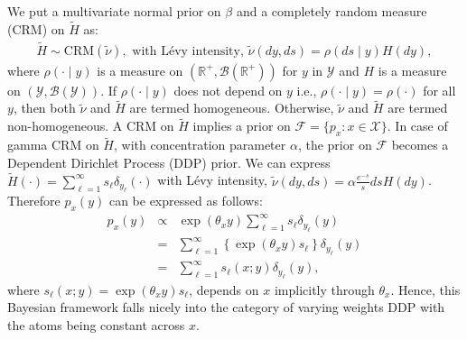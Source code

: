 \documentclass[10pt, oneside]{article}   	%
\renewcommand{\th}{\theta}
\newcommand{\thh}{\widetilde{H}}
\newcommand{\scf}{\mathcal{F}}
\newcommand{\sx}{\mathcal{X}}
\newcommand{\sy}{\mathcal{Y}}
\newcommand{\R}{\mathbb{R}}
\renewcommand{\scf}{\mathcal{F}}
\renewcommand{\sx}{\mathcal{X}}
\renewcommand{\sy}{\mathcal{Y}}
\newcommand{\sbb}{\mathcal{B}}
\begin{document}
We put a multivariate normal prior on $\beta$ and a completely random measure (CRM) on $\thh$ as:
\begin{eqnarray}
\thh \sim \mbox{CRM}(\widetilde{\nu}), \mbox{ with L\'evy intensity, } \widetilde \nu (dy, ds) = \rho(ds \mid y) H(dy), \label{eq4}
\end{eqnarray}
where $\rho(\cdot \mid y)$ is a measure on $(\R^+, \sbb(\R^+))$ for $y$ in $\sy$ and $H$ is a measure on $(\mathcal{Y}, \sbb(\sy))$.  If $\rho(\cdot \mid y)$ does not depend on $y$ i.e.,  $\rho(\cdot \mid y) = \rho(\cdot)$ for all $y$, then both $\widetilde \nu$ and $\thh$ are termed homogeneous. Otherwise, $\widetilde \nu$ and $\thh$ are termed non-homogeneous. A CRM on $\thh$ implies a prior on $\scf = \{p_x: x \in \sx\}$. In case of gamma CRM on $\thh$, with concentration parameter $\alpha$, the prior on $\scf$ becomes a Dependent Dirichlet Process (DDP) prior. We can express $\thh(\cdot) = \sum_{\ell=1}^{\infty} s_\ell \delta_{y_\ell}(\cdot)$ with L\'evy intensity, $\widetilde{\nu}(dy, ds)=\alpha \frac{e^{-s}}{s} ds H(dy)$.  Therefore $p_x(y)$ can be expressed as follows:
\begin{eqnarray*}
p_x(y) & \propto &\exp \left(\th_x y \right) \sum_{\ell=1}^\infty s_\ell \delta_{y_\ell} (y)\\
& = & 
\sum_{\ell=1}^\infty \left\{\exp\left(\th_x y\right)  s_\ell\right\} \delta_{y_\ell} (y) \\
& = & 
\sum_{\ell=1}^\infty  s_\ell(x; y) \delta_{y_\ell} (y),
\end{eqnarray*}
where $s_\ell(x; y) = \exp\left(\th_x y\right)  s_\ell$, depends on $x$ implicitly through $\th_x$. Hence, this Bayesian framework falls nicely into the category of varying weights DDP with the atoms being constant across $x$. 
\end{document}
